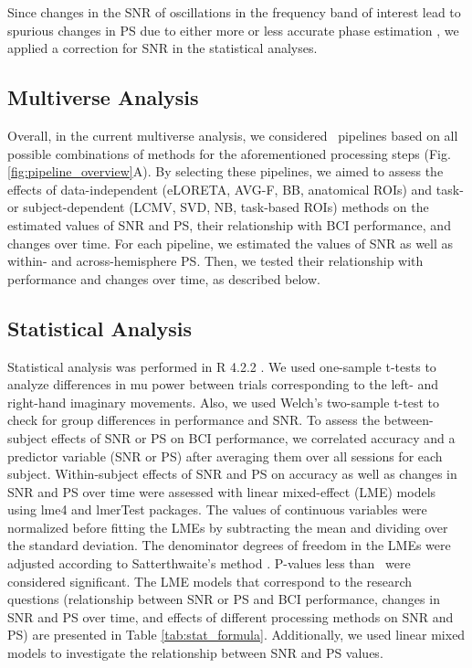 \medskip

Since changes in the SNR of oscillations in the frequency band of interest lead to spurious changes in PS due to either more or less accurate phase estimation \citep{MuthukumaraswamySingh2011}, we applied a correction for SNR in the statistical analyses.

\subsection{Multiverse Analysis}

Overall, in the current multiverse analysis, we considered \numPipelines~pipelines based on all possible combinations of methods for the aforementioned processing steps (Fig. \ref{fig:pipeline_overview}A). By selecting these pipelines, we aimed to assess the effects of data-independent (eLORETA, AVG-F, BB, anatomical ROIs) and task- or subject-dependent (LCMV, SVD, NB, task-based ROIs) methods on the estimated values of SNR and PS, their relationship with BCI performance, and changes over time. For each pipeline, we estimated the values of SNR as well as within- and across-hemisphere PS. Then, we tested their relationship with performance and changes over time, as described below.

\subsection{Statistical Analysis}

Statistical analysis was performed in R 4.2.2 \citep{R_Core}. We used one-sample t-tests to analyze differences in mu power between trials corresponding to the left- and right-hand imaginary movements. Also, we used Welch's two-sample t-test to check for group differences in performance and SNR. To assess the between-subject effects of SNR or PS on BCI performance, we correlated accuracy and a predictor variable (SNR or PS) after averaging them over all sessions for each subject. Within-subject effects of SNR and PS on accuracy as well as changes in SNR and PS over time were assessed with linear mixed-effect (LME) models using lme4 \citep{R_lme4} and lmerTest \citep{R_lmerTest} packages. The values of continuous variables were normalized before fitting the LMEs by subtracting the mean and dividing over the standard deviation. The denominator degrees of freedom in the LMEs were adjusted according to Satterthwaite's method \citep{Satterthwaite1946}. P-values less than \pSignificant~were considered significant. The LME models that correspond to the research questions (relationship between SNR or PS and BCI performance, changes in SNR and PS over time, and effects of different processing methods on SNR and PS) are presented in Table \ref{tab:stat_formula}. Additionally, we used linear mixed models to investigate the relationship between SNR and PS values.

